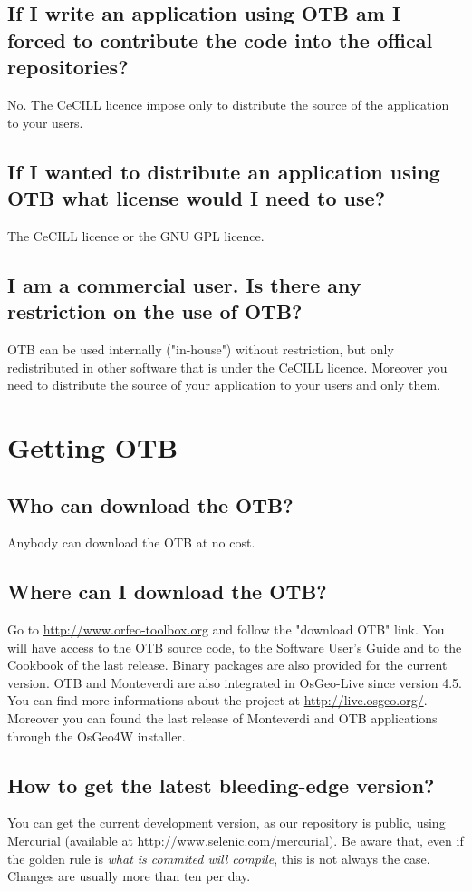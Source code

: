 \subsection{If I write an application using OTB am I forced to contribute the code into the offical repositories?}
No. The CeCILL licence impose only to distribute the source of the application to your users.

\subsection{If I wanted to distribute an application using OTB what license would I need to use?}
The CeCILL licence or the GNU GPL licence.

\subsection{I am a commercial user. Is there any restriction on the
  use of OTB?}
OTB can be used internally ("in-house") without restriction, but only
redistributed in other software that is under the CeCILL licence. 
Moreover you need to distribute the source of your application to your
users and only them.

\section{Getting OTB}

\subsection{Who can download the OTB?}
Anybody can download the OTB at no cost.

\subsection{Where can I download the OTB?}
Go to \url{http://www.orfeo-toolbox.org}
 and follow the "download OTB" link. You will have access to the OTB
source code, to the Software User's Guide and to the Cookbook of the last release. 
Binary packages are also provided for the current version.
OTB and Monteverdi are also integrated in OsGeo-Live since version 4.5.
You can find more informations about the project at \url{http://live.osgeo.org/}. 
Moreover you can found the last release of Monteverdi and OTB applications through 
the OsGeo4W installer. 

\subsection{How to get the latest bleeding-edge version?}\label{sec:FAQMercurial}
You can get the current development version, as our repository is public, using Mercurial (available at \url{http://www.selenic.com/mercurial}). Be aware that, even if the golden rule is {\em what is commited will compile}, this is not always the case. Changes are usually more than ten per day.


